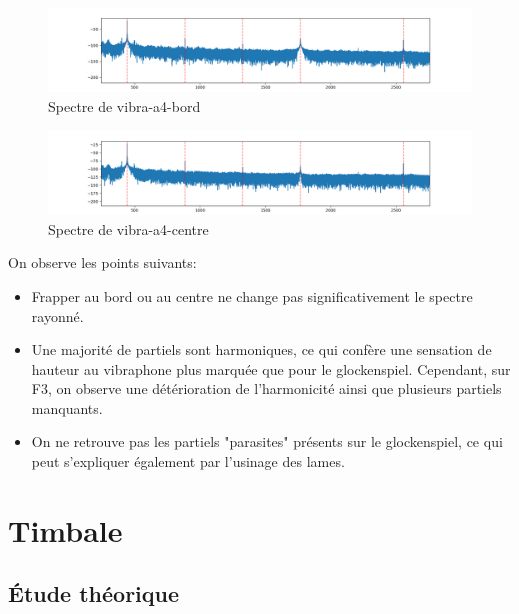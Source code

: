 \documentclass[atiam, article]{rapport} %
\begin{document}
\begin{figure}
  \begin{center}
      \includegraphics[width=\textwidth]{percu/vibra-a4-bord.wav.spectre.png}
  \end{center}
  \caption{Spectre de vibra-a4-bord}
  \label{fig:spectre-vibra-a4-bord.wav}
\end{figure}


\begin{figure}
  \begin{center}
      \includegraphics[width=\textwidth]{percu/vibra-a4-centre.wav.spectre.png}
  \end{center}
  \caption{Spectre de vibra-a4-centre}
  \label{fig:spectre-vibra-a4-centre.wav}
\end{figure}


On observe les points suivants:
\begin{itemize}
  \item Frapper au bord ou au centre ne change pas significativement le spectre rayonné.
  \item Une majorité de partiels sont harmoniques, ce qui confère une sensation de hauteur au vibraphone plus marquée que pour le glockenspiel. Cependant, sur F3, on observe une détérioration de l'harmonicité ainsi que plusieurs partiels manquants.
  \item On ne retrouve pas les partiels "parasites" présents sur le glockenspiel, ce qui peut s'expliquer également par l'usinage des lames.
\end{itemize}

\section{Timbale}
\subsection{Étude théorique}
\end{document}
